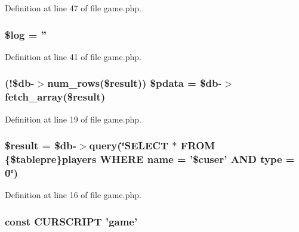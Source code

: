 Definition at line 47 of file game.\+php.

\hypertarget{game_8php_a9a2cf15a653aee8be437f7ae474cd494}{
\subsubsection[{\$log}]{\setlength{\rightskip}{0pt plus 5cm}\$log = ''}}\label{game_8php_a9a2cf15a653aee8be437f7ae474cd494}


Definition at line 41 of file game.\+php.

\hypertarget{game_8php_a6378350bbbdfdf1fdd8c8e1cd0607a8d}{
\subsubsection[{\$pdata}]{ (!\$db-\/$>$num\+\_\+rows(\${\bf result})) \$pdata = \$db-\/$>$fetch\+\_\+array(\${\bf result})}}\label{game_8php_a6378350bbbdfdf1fdd8c8e1cd0607a8d}


Definition at line 19 of file game.\+php.

\hypertarget{game_8php_a112ef069ddc0454086e3d1e6d8d55d07}{
\subsubsection[{\$result}]{\setlength{\rightskip}{0pt plus 5cm}\${\bf result} = \$db-\/$>$query(\char`\"{}S\+E\+L\+E\+C\+T $\ast$ F\+R\+O\+M \{\$tablepre\}players W\+H\+E\+R\+E name = '\$cuser' A\+N\+D type = 0\char`\"{})}}\label{game_8php_a112ef069ddc0454086e3d1e6d8d55d07}


Definition at line 16 of file game.\+php.

\hypertarget{game_8php_a39c39f525eceb86cabc338804f230e80}{
\subsubsection[{C\+U\+R\+S\+C\+R\+I\+P\+T}]{\setlength{\rightskip}{0pt plus 5cm}const C\+U\+R\+S\+C\+R\+I\+P\+T 'game'}}\label{game_8php_a39c39f525eceb86cabc338804f230e80}


